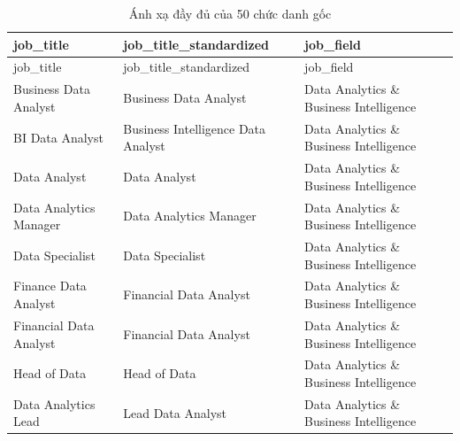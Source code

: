 \begin{longtable}[]{@{}
  >{\raggedright\arraybackslash}p{}
  >{\raggedright\arraybackslash}p{}
  >{\raggedright\arraybackslash}p{}@{}}
\caption{Ánh xạ đầy đủ của 50 chức danh gốc}\tabularnewline
\toprule\noalign{}
\begin{minipage}[b]{\linewidth}\raggedright
job\_title
\end{minipage} & \begin{minipage}[b]{\linewidth}\raggedright
job\_title\_standardized
\end{minipage} & \begin{minipage}[b]{\linewidth}\raggedright
job\_field
\end{minipage} \\
\midrule\noalign{}
\endfirsthead
\toprule\noalign{}
\begin{minipage}[b]{\linewidth}\raggedright
job\_title
\end{minipage} & \begin{minipage}[b]{\linewidth}\raggedright
job\_title\_standardized
\end{minipage} & \begin{minipage}[b]{\linewidth}\raggedright
job\_field
\end{minipage} \\
\midrule\noalign{}
\endhead
\bottomrule\noalign{}
\endlastfoot
Business Data Analyst & Business Data Analyst & Data Analytics \&
Business Intelligence \\
BI Data Analyst & Business Intelligence Data Analyst & Data Analytics \&
Business Intelligence \\
Data Analyst & Data Analyst & Data Analytics \& Business Intelligence \\
Data Analytics Manager & Data Analytics Manager & Data Analytics \&
Business Intelligence \\
Data Specialist & Data Specialist & Data Analytics \& Business
Intelligence \\
Finance Data Analyst & Financial Data Analyst & Data Analytics \&
Business Intelligence \\
Financial Data Analyst & Financial Data Analyst & Data Analytics \&
Business Intelligence \\
Head of Data & Head of Data & Data Analytics \& Business Intelligence \\
Data Analytics Lead & Lead Data Analyst & Data Analytics \& Business
Intelligence \\

\end{longtable}
